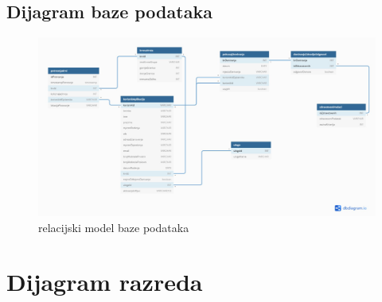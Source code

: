 			\subsection{Dijagram baze podataka}
				\begin{figure}[H]
	\centering
	\includegraphics[width=\textwidth, scale=2.0]{dijagrami/relShema.png}
	\caption{relacijski model baze podataka}
	\label{fig:dijagram_baze}
\end{figure}
			\eject
			
		\section{Dijagram razreda}
		
